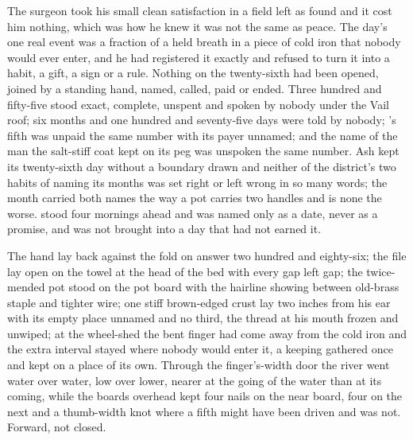 The surgeon took his small clean satisfaction in a field left as found and it cost him nothing, which was how he knew it was not the same as peace. The day's one real event was a fraction of a held breath in a piece of cold iron that nobody would ever enter, and he had registered it exactly and refused to turn it into a habit, a gift, a sign or a rule. Nothing on the twenty-sixth had been opened, joined by a standing hand, named, called, paid or ended. Three hundred and fifty-five stood exact, complete, unspent and spoken by nobody under the Vail roof; six months and one hundred and seventy-five days were told by nobody; 's fifth was unpaid the same number with its payer unnamed; and the name of the man the salt-stiff coat kept on its peg was unspoken the same number. Ash kept its twenty-sixth day without a boundary drawn and neither of the district's two habits of naming its months was set right or left wrong in so many words; the month carried both names the way a pot carries two handles and is none the worse.  stood four mornings ahead and was named only as a date, never as a promise, and was not brought into a day that had not earned it.

The hand lay back against the fold on answer two hundred and eighty-six; the file lay open on the towel at the head of the bed with every gap left gap; the twice-mended pot stood on the pot board with the hairline showing between old-brass staple and tighter wire; one stiff brown-edged crust lay two inches from his ear with its empty place unnamed and no third, the thread at his mouth frozen and unwiped; at the wheel-shed the bent finger had come away from the cold iron and the extra interval stayed where nobody would enter it, a keeping gathered once and kept on a place of its own. Through the finger's-width door the river went water over water, low over lower, nearer at the going of the water than at its coming, while the boards overhead kept four nails on the near board, four on the next and a thumb-width knot where a fifth might have been driven and was not. Forward, not closed.
